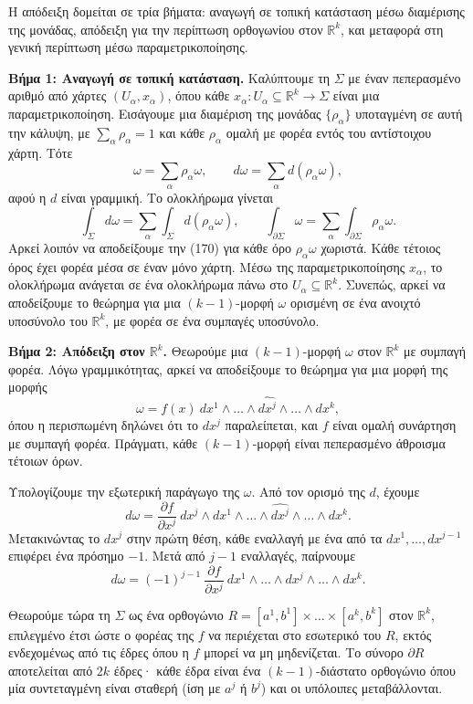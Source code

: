 \documentclass[12pt]{article}
\begin{document}
Η απόδειξη δομείται σε τρία βήματα: αναγωγή σε τοπική κατάσταση μέσω διαμέρισης της μονάδας, απόδειξη για την περίπτωση ορθογωνίου στον $\mathbb{R}^k$, και μεταφορά στη γενική περίπτωση μέσω παραμετρικοποίησης.

\textbf{Βήμα 1: Αναγωγή σε τοπική κατάσταση.} Καλύπτουμε τη $\Sigma$ με έναν πεπερασμένο αριθμό από χάρτες $(U_\alpha, x_\alpha)$, όπου κάθε $x_\alpha: U_\alpha \subseteq \mathbb{R}^k \to \Sigma$ είναι μια παραμετρικοποίηση. Εισάγουμε μια διαμέριση της μονάδας $\{\rho_\alpha\}$ υποταγμένη σε αυτή την κάλυψη, με $\sum_\alpha \rho_\alpha = 1$ και κάθε $\rho_\alpha$ ομαλή με φορέα εντός του αντίστοιχου χάρτη. Τότε
\[
\omega = \sum_\alpha \rho_\alpha \omega, \qquad d\omega = \sum_\alpha d(\rho_\alpha \omega),
\]
αφού η $d$ είναι γραμμική. Το ολοκλήρωμα γίνεται
\[
\int_\Sigma d\omega = \sum_\alpha \int_\Sigma d(\rho_\alpha \omega), \qquad \int_{\partial \Sigma} \omega = \sum_\alpha \int_{\partial \Sigma} \rho_\alpha \omega.
\]
Αρκεί λοιπόν να αποδείξουμε την (170) για κάθε όρο $\rho_\alpha \omega$ χωριστά. Κάθε τέτοιος όρος έχει φορέα μέσα σε έναν μόνο χάρτη. Μέσω της παραμετρικοποίησης $x_\alpha$, το ολοκλήρωμα ανάγεται σε ένα ολοκλήρωμα πάνω στο $U_\alpha \subseteq \mathbb{R}^k$. Συνεπώς, αρκεί να αποδείξουμε το θεώρημα για μια $(k-1)$-μορφή $\omega$ ορισμένη σε ένα ανοιχτό υποσύνολο του $\mathbb{R}^k$, με φορέα σε ένα συμπαγές υποσύνολο.

\textbf{Βήμα 2: Απόδειξη στον $\mathbb{R}^k$.} Θεωρούμε μια $(k-1)$-μορφή $\omega$ στον $\mathbb{R}^k$ με συμπαγή φορέα. Λόγω γραμμικότητας, αρκεί να αποδείξουμε το θεώρημα για μια μορφή της μορφής
\[
\omega = f(x) \ dx^1 \wedge \dots \wedge \widehat{dx^j} \wedge \dots \wedge dx^k,
\]
όπου η περισπωμένη δηλώνει ότι το $dx^j$ παραλείπεται, και $f$ είναι ομαλή συνάρτηση με συμπαγή φορέα. Πράγματι, κάθε $(k-1)$-μορφή είναι πεπερασμένο άθροισμα τέτοιων όρων.

Υπολογίζουμε την εξωτερική παράγωγο της $\omega$. Από τον ορισμό της $d$, έχουμε
\[
d\omega = \frac{\partial f}{\partial x^j} \ dx^j \wedge dx^1 \wedge \dots \wedge \widehat{dx^j} \wedge \dots \wedge dx^k.
\]
Μετακινώντας το $dx^j$ στην πρώτη θέση, κάθε εναλλαγή με ένα από τα $dx^1, \dots, dx^{j-1}$ επιφέρει ένα πρόσημο $-1$. Μετά από $j-1$ εναλλαγές, παίρνουμε
\[
d\omega = (-1)^{j-1} \ \frac{\partial f}{\partial x^j} \ dx^1 \wedge \dots \wedge dx^j \wedge \dots \wedge dx^k.
\]

Θεωρούμε τώρα τη $\Sigma$ ως ένα ορθογώνιο $R = [a^1, b^1] \times \dots \times [a^k, b^k]$ στον $\mathbb{R}^k$, επιλεγμένο έτσι ώστε ο φορέας της $f$ να περιέχεται στο εσωτερικό του $R$, εκτός ενδεχομένως από τις έδρες όπου η $f$ μπορεί να μη μηδενίζεται. Το σύνορο $\partial R$ αποτελείται από $2k$ έδρες· κάθε έδρα είναι ένα $(k-1)$-διάστατο ορθογώνιο όπου μία συντεταγμένη είναι σταθερή (ίση με $a^j$ ή $b^j$) και οι υπόλοιπες μεταβάλλονται.
\end{document}
